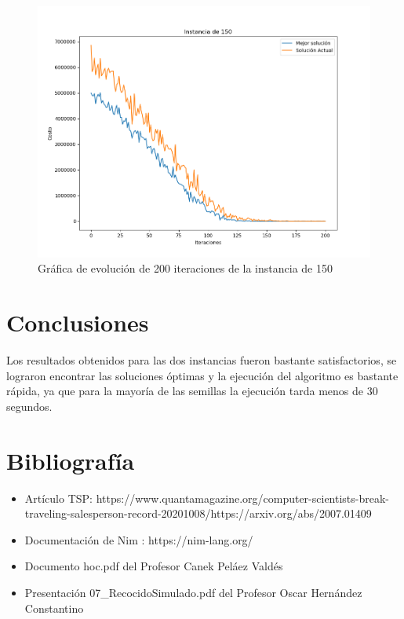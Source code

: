 \documentclass[12pt]{article}
\begin{document}
	\begin{figure}[H]
		\centering
		\caption{Gráfica de evolución de 200 iteraciones de la instancia de 150}
		\includegraphics[scale=0.6,width=12cm]{I150_3.png}
	\end{figure}
	\section{Conclusiones}
	
	Los resultados obtenidos para las dos instancias fueron bastante satisfactorios, se lograron encontrar las soluciones óptimas y la ejecución del algoritmo es bastante 
	rápida,	ya que para la mayoría de las semillas la ejecución tarda menos de 30 
	segundos.
	 
	\section{Bibliografía}
	
	\begin{itemize}
		\item Artículo TSP:  https://www.quantamagazine.org/computer-scientists-break-traveling-salesperson-record-20201008/https://arxiv.org/abs/2007.01409
		\item  Documentación de Nim : https://nim-lang.org/
		\item Documento hoc.pdf del Profesor Canek Peláez Valdés
		\item Presentación 07\_RecocidoSimulado.pdf del Profesor Oscar Hernández 
		Constantino 
	\end{itemize}
	
\end{document}
